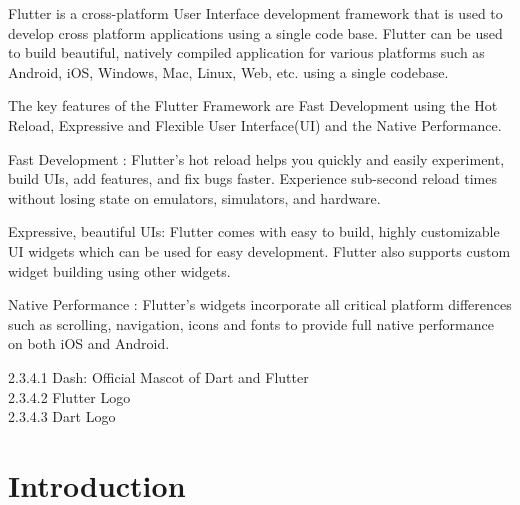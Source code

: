 \documentclass[11pt,a4paper,oneside,openright]{report}
\begin{document}
{{ \hspace{0.2in}Flutter is a cross-platform User Interface development framework that is used to develop cross platform applications using a single code base. Flutter can be used to build beautiful, natively compiled application for various platforms such as Android, iOS, Windows, Mac, Linux, Web, etc. using a single codebase. 

 \hspace{0.2in}The key features of the Flutter Framework are Fast Development using the Hot Reload, Expressive and Flexible User Interface(UI) and the Native Performance.

\hspace{0.2in}Fast Development : Flutter's hot reload helps you quickly and easily experiment, build UIs, add features, and fix bugs faster. Experience sub-second reload times without losing state on emulators, simulators, and hardware.

\hspace{0.2in} Expressive, beautiful UIs: Flutter comes with easy to build, highly customizable UI widgets which can be used for easy development. Flutter also supports custom widget building using other widgets.

\hspace{0.2in} Native Performance : Flutter’s widgets incorporate all critical platform differences such as scrolling, navigation, icons and fonts to provide full native performance on both iOS and Android. 

\newpage
{} %
\tableofcontents
\newpage

\listoffigures
\begin{flushleft}
2.3.4.1 Dash: Official Mascot of Dart and Flutter\\
 2.3.4.2 Flutter Logo\\
 2.3.4.3 Dart Logo\\
\end{flushleft}
 




\chapter{Introduction}
\label{chap:intro}

}}
\end{document}
